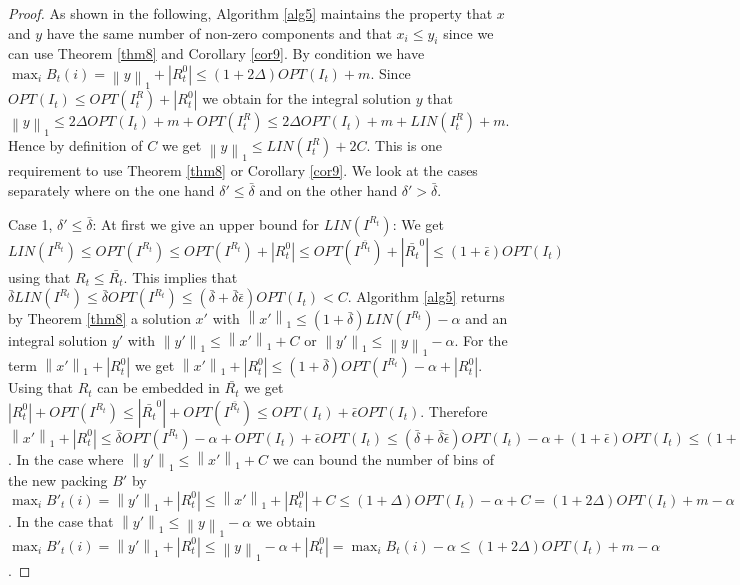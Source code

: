 \documentclass[a4paper,11pt]{article}
\newcommand{\nor}[1]{\left\|#1\right\|}
\begin{document}
\begin{proof}
	As shown in the following, Algorithm \ref{alg5} maintains the property that $x$ and $y$ have
	the same number of non-zero components and that $x_i \leq y_i$ since we can use Theorem \ref{thm8} and Corollary \ref{cor9}.
	By condition we have $\max_i B_t (i) = \nor{y}_1 + |R_{t}^0| \leq (1+ 2\Delta) \mathit{OPT}(I_t)+m$. Since
	$ \mathit{OPT}(I_t) \leq  \mathit{OPT}(I^{R}_t) + |R_{t}^0|$ we obtain for the integral solution $y$ that
	$\nor{y}_1 \leq 2\Delta \mathit{OPT}(I_t)+m + \mathit{OPT}(I^{R}_t) \leq  2\Delta \mathit{OPT}(I_t)+m + \mathit{LIN}(I^{R}_t) +m$.
	Hence by definition of $C$ we get $\nor{y}_1 \leq  \mathit{LIN}(I^{R}_t) + 2C$. This is one requirement to use Theorem \ref{thm8} 
	or Corollary \ref{cor9}.
	We look at the cases separately where on the one hand $\delta' \leq \bar{\delta}$ and on the other hand 
	$\delta' > \bar{\delta}$. 
	
	Case 1, $\delta' \leq \bar{\delta}$:
	At first we give an upper bound for $\mathit{LIN(I^{R_t})}$: We get $\mathit{LIN(I^{R_t})} \leq \mathit{OPT}(I^{R_t}) \leq 
	\mathit{OPT}(I^{R_t}) +  |R_{t}^0| \leq
	\mathit{OPT}(I^{\bar{R_t}}) + |\bar{R_{t}}^0| \leq (1+ \bar{\epsilon}) \mathit{OPT}(I_t)$ using
	that $R_t \leq \bar{R_{t}}$. This implies
	that $\bar{\delta} \mathit{LIN(I^{R_t})} \leq \bar{\delta} \mathit{OPT}(I^{R_t}) \leq
	 (\bar{\delta} + \bar{\delta}\bar{\epsilon}) \mathit{OPT}(I_t) < C$.
	Algorithm \ref{alg5} returns by Theorem \ref{thm8} a solution $x'$ with $\nor{x'}_1 \leq 
	(1+\bar{\delta})\mathit{LIN(I^{R_t})}-\alpha$ and an integral solution $y'$ with 
	$\nor{y'}_1 \leq \nor{x'}_1 + C$ or $\nor{y'}_1 \leq \nor{y}_1 - \alpha$.
	For the term $\nor{x'}_1 + |R_{t}^0|$ we get  $\nor{x'}_1 + |R_{t}^0| \leq 
	(1+ \bar{\delta}) \mathit{OPT}(I^{R_t}) - \alpha + |R_{t}^0|$.
	Using that $R_t$ can be embedded in $\bar{R_t}$ we get $|R_{t}^0| + \mathit{OPT}(I^{R_t}) \leq |\bar{R_t}^0| + 
	\mathit{OPT}(I^{\bar{R_t}}) \leq \mathit{OPT}(I_t) + \bar{\epsilon} \mathit{OPT}(I_t)$. 
	Therefore $\nor{x'}_1 + |R_{t}^0| \leq \bar{\delta} \mathit{OPT}(I^{R_t})
	- \alpha + \mathit{OPT}(I_t) + \bar{\epsilon} \mathit{OPT}(I_t) \leq 
	(\bar{\delta} + \bar{\delta}\bar{\epsilon}) \mathit{OPT}(I_t) - \alpha + (1+ \bar{\epsilon}) \mathit{OPT}(I_t)
	\leq (1 + \Delta) \mathit{OPT}(I_t) - \alpha$.
	In the case where $\nor{y'}_1 \leq \nor{x'}_1 + C$ we can bound the number of bins of the new packing $B'$ 
	by	$\max_i B'_t (i) = \nor{y'}_1 + |R_{t}^0| \leq \nor{x'}_1+ |R_{t}^0| + C  
	\leq (1 + \Delta) \mathit{OPT}(I_t) - \alpha + C = (1 + 2 \Delta) \mathit{OPT}(I_t) +m - \alpha$.
	In the case that $\nor{y'}_1 \leq \nor{y}_1 - \alpha$ we obtain
	$\max_i B'_t (i) = \nor{y'}_1 + |R_{t}^0| \leq \nor{y}_1 - \alpha + |R_{t}^0| =  \max_i B_t (i) - \alpha
	\leq (1+ 2\Delta) \mathit{OPT}(I_t) +m- \alpha$.
	

\end{proof}
\end{document}
